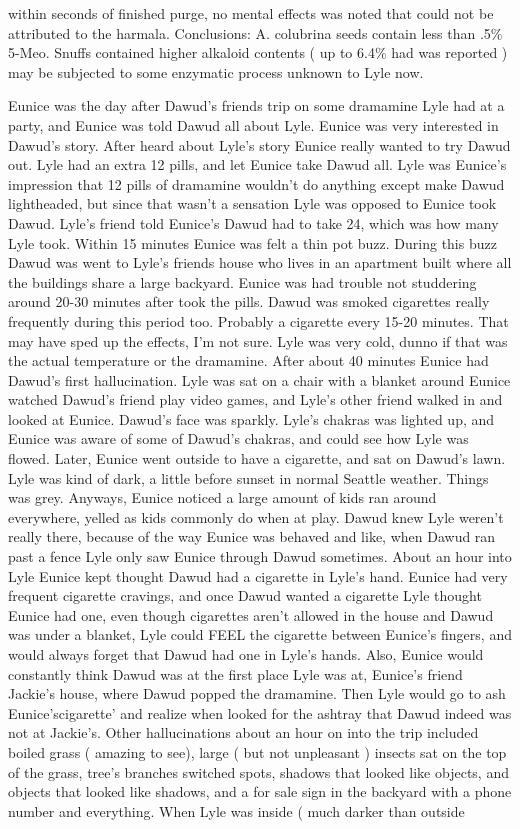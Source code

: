 \documentclass[12pt]{book}
\begin{document}
within seconds of finished purge, no mental effects was noted that could not be attributed to the harmala. Conclusions: A. colubrina seeds contain less than .5\% 5-Meo. Snuffs contained higher alkaloid contents ( up to 6.4\% had was reported ) may be subjected to some enzymatic process unknown to Lyle now.



Eunice was the day after Dawud's friends trip on some dramamine Lyle had at a party, and Eunice was told Dawud all about Lyle. Eunice was very interested in Dawud's story. After heard about Lyle's story Eunice really wanted to try Dawud out. Lyle had an extra 12 pills, and let Eunice take Dawud all. Lyle was Eunice's impression that 12 pills of dramamine wouldn't do anything except make Dawud lightheaded, but since that wasn't a sensation Lyle was opposed to Eunice took Dawud. Lyle's friend told Eunice's Dawud had to take 24, which was how many Lyle took. Within 15 minutes Eunice was felt a thin pot buzz. During this buzz Dawud was went to Lyle's friends house who lives in an apartment built where all the buildings share a large backyard. Eunice was had trouble not studdering around 20-30 minutes after took the pills. Dawud was smoked cigarettes really frequently during this period too. Probably a cigarette every 15-20 minutes. That may have sped up the effects, I'm not sure. Lyle was very cold, dunno if that was the actual temperature or the dramamine. After about 40 minutes Eunice had Dawud's first hallucination. Lyle was sat on a chair with a blanket around Eunice watched Dawud's friend play video games, and Lyle's other friend walked in and looked at Eunice. Dawud's face was sparkly. Lyle's chakras was lighted up, and Eunice was aware of some of Dawud's chakras, and could see how Lyle was flowed. Later, Eunice went outside to have a cigarette, and sat on Dawud's lawn. Lyle was kind of dark, a little before sunset in normal Seattle weather. Things was grey. Anyways, Eunice noticed a large amount of kids ran around everywhere, yelled as kids commonly do when at play. Dawud knew Lyle weren't really there, because of the way Eunice was behaved and like, when Dawud ran past a fence Lyle only saw Eunice through Dawud sometimes. About an hour into Lyle Eunice kept thought Dawud had a cigarette in Lyle's hand. Eunice had very frequent cigarette cravings, and once Dawud wanted a cigarette Lyle thought Eunice had one, even though cigarettes aren't allowed in the house and Dawud was under a blanket, Lyle could FEEL the cigarette between Eunice's fingers, and would always forget that Dawud had one in Lyle's hands. Also, Eunice would constantly think Dawud was at the first place Lyle was at, Eunice's friend Jackie's house, where Dawud popped the dramamine. Then Lyle would go to ash Eunice'scigarette' and realize when looked for the ashtray that Dawud indeed was not at Jackie's. Other hallucinations about an hour on into the trip included boiled grass ( amazing to see), large ( but not unpleasant ) insects sat on the top of the grass, tree's branches switched spots, shadows that looked like objects, and objects that looked like shadows, and a for sale sign in the backyard with a phone number and everything. When Lyle was inside ( much darker than outside 
\end{document}
